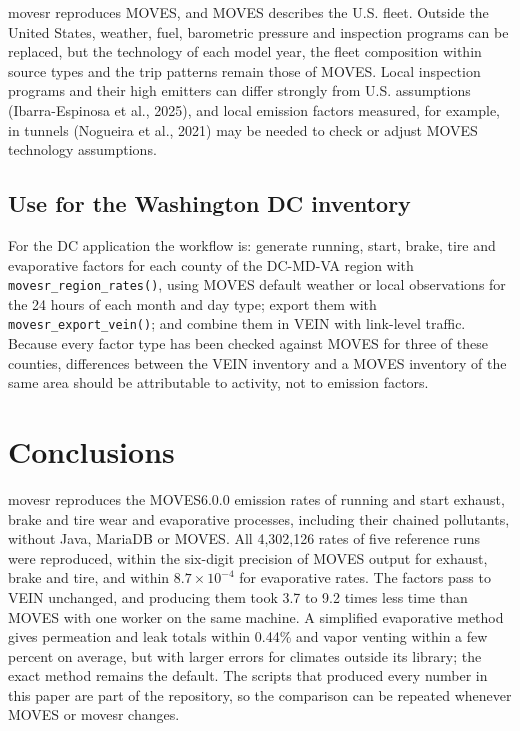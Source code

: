 \documentclass[preprint,
3p]{elsarticle} %
\begin{document}
movesr reproduces MOVES, and MOVES describes the U.S. fleet. Outside the
United States, weather, fuel, barometric pressure and inspection
programs can be replaced, but the technology of each model year, the
fleet composition within source types and the trip patterns remain those
of MOVES. Local inspection programs and their high emitters can differ
strongly from U.S. assumptions (Ibarra-Espinosa et al., 2025), and local
emission factors measured, for example, in tunnels (Nogueira et al.,
2021) may be needed to check or adjust MOVES technology assumptions.

\subsection{Use for the Washington DC
inventory}\label{use-for-the-washington-dc-inventory}

For the DC application the workflow is: generate running, start, brake,
tire and evaporative factors for each county of the DC-MD-VA region with
\texttt{movesr\_region\_rates()}, using MOVES default weather or local
observations for the 24 hours of each month and day type; export them
with \texttt{movesr\_export\_vein()}; and combine them in VEIN with
link-level traffic. Because every factor type has been checked against
MOVES for three of these counties, differences between the VEIN
inventory and a MOVES inventory of the same area should be attributable
to activity, not to emission factors.

\section{Conclusions}\label{conclusions}

movesr reproduces the MOVES6.0.0 emission rates of running and start
exhaust, brake and tire wear and evaporative processes, including their
chained pollutants, without Java, MariaDB or MOVES. All 4,302,126 rates
of five reference runs were reproduced, within the six-digit precision
of MOVES output for exhaust, brake and tire, and within
\(8.7 \times 10^{-4}\) for evaporative rates. The factors pass to VEIN
unchanged, and producing them took 3.7 to 9.2 times less time than MOVES
with one worker on the same machine. A simplified evaporative method
gives permeation and leak totals within 0.44\% and vapor venting within
a few percent on average, but with larger errors for climates outside
its library; the exact method remains the default. The scripts that
produced every number in this paper are part of the repository, so the
comparison can be repeated whenever MOVES or movesr changes.
\end{document}
